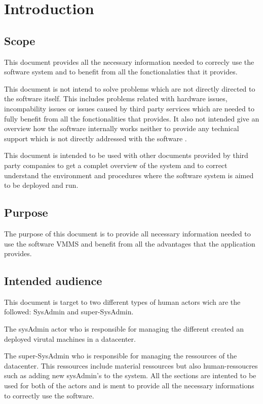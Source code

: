 \chapter{Introduction}
\label{chap:introduction}

\section{Scope}
This document provides all the necessary information needed to correcly use the
software system \mysystemname and to benefit from all the fonctionalaties that
it provides.

This document is not intend to solve problems which are not directly directed to
the software \mysystemname itself. This includes problems related with hardware
issues, incompability issues or issues caused by third party services which are
needed to fully benefit from all the fonctionalities that \mysystemname
provides. It also not intended give an overview how the software \mysystemname
internally works neither to provide any technical support which is not directly 
addressed with the software \mysystemname.

This document is intended to be used with other documents provided by third
party companies to get a complet overview of the system \mysystemname and to
correct understand the environment and procedures where the software system
\mysystemname is aimed to be deployed and run.


\section{Purpose}
The purpose of this document is to provide all necessary information
needed to use the software VMMS and benefit from all the advantages that the
application provides.


\section{Intended audience}
This document is target to two different types of human actors wich are the 
followed: SysAdmin and super-SysAdmin.

The sysAdmin actor who is responsible for managing the different created an
deployed virutal machines in a datacenter.

The super-SysAdmin who is responsible for managing the ressources of the
datacenter. This ressources include material ressources but also
human-ressoucres such as adding new sysAdmin's to the system. All the sections
are intented to be used for both of the actors and is ment to provide all the 
necessary informations to correctly use the software.




